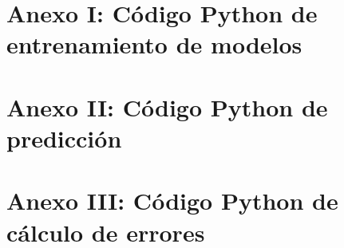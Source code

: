 \chapter*{Anexo I: Código Python de entrenamiento de modelos}\label{anexo1}


\chapter*{Anexo II: Código Python de predicción}\label{anexo2}


\chapter*{Anexo III: Código Python de cálculo de errores}\label{anexo3}


